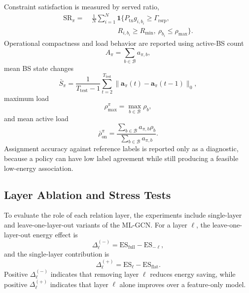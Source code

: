 \documentclass[journal]{IEEEtran}
\begin{document}
Constraint satisfaction is measured by served ratio,
\begin{align}
    \mathrm{SR}_{\pi}
    =&\ \frac{1}{N}\sum_{i=1}^{N}
    \mathbf{1}\Big\{
    P_{\mathrm{tx}}g_{i,b_i}\geq\Gamma_{\mathrm{rsrp}},
    \nonumber\\
    &\qquad\qquad
    R_{i,b_i}\geq R_{\min},
    \ \rho_{b_i}\leq\rho_{\max}
    \Big\}.
    \label{eq:served_ratio_metric}
\end{align}
Operational compactness and load behavior are reported using active-BS count
\begin{equation}
    A_{\pi}=\sum_{b\in\mathcal{B}}a_{\pi,b},
\end{equation}
mean BS state changes
\begin{equation}
    \bar{S}_{\pi}=
    \frac{1}{T_{\mathrm{test}}-1}
    \sum_{t=2}^{T_{\mathrm{test}}}
    \|\mathbf{a}_{\pi}(t)-\mathbf{a}_{\pi}(t-1)\|_0,
    \label{eq:mean_switch_metric}
\end{equation}
maximum load
\begin{equation}
    \rho_{\max}^{\pi}=\max_{b\in\mathcal{B}}\rho_b,
\end{equation}
and mean active load
\begin{equation}
    \bar{\rho}_{\mathrm{on}}^{\pi}
    =
    \frac{\sum_{b\in\mathcal{B}}a_{\pi,b}\rho_b}
    {\sum_{b\in\mathcal{B}}a_{\pi,b}}.
\end{equation}
Assignment accuracy against reference labels is reported only as a diagnostic,
because a policy can have low label agreement while still producing a feasible
low-energy association.

\subsection{Layer Ablation and Stress Tests}
To evaluate the role of each relation layer, the experiments include
single-layer and leave-one-layer-out variants of the ML-GCN. For a layer
$\ell$, the leave-one-layer-out energy effect is
\begin{equation}
    \Delta_{\ell}^{(-)}
    =
    \mathrm{ES}_{\mathrm{full}}
    -
    \mathrm{ES}_{-\ell},
    \label{eq:leave_one_out_metric}
\end{equation}
and the single-layer contribution is
\begin{equation}
    \Delta_{\ell}^{(+)}
    =
    \mathrm{ES}_{\ell}
    -
    \mathrm{ES}_{\mathrm{flat}}.
    \label{eq:single_layer_metric}
\end{equation}
Positive $\Delta_{\ell}^{(-)}$ indicates that removing layer $\ell$ reduces
energy saving, while positive $\Delta_{\ell}^{(+)}$ indicates that layer
$\ell$ alone improves over a feature-only model.
\end{document}
